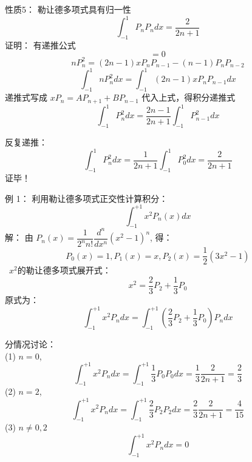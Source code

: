 \begin{frame}
	\alert{性质5：} 勒让德多项式具有归一性
	\begin{equation*}
		\int_{-1}^{1} P_nP_n dx = \frac{2}{2n+1}
	\end{equation*}	
	\alert{证明：}  有递推公式
	\begin{equation*}
		[nP_{n} -(2n-1)x P_{n-} + (n-1)P_{n-2} ] =0
	\end{equation*}		
	\begin{equation*}
		nP ^2 _{n} =(2n-1)x P_n P_{n-1} - (n-1)P_nP_{n-2} 
	\end{equation*}		
	\begin{equation*}
		\int_{-1}^{1}  nP ^2 _{n} dx =   \int_{-1}^{1}  (2n-1)x P_n P_{n-1} dx 
	\end{equation*}		
	递推式写成 $xP_n= A P_{n+1} +B P_{n-1}$ 代入上式，得积分递推式
	\begin{equation*}
		\int_{-1}^{1}  P ^2 _{n} dx =  \frac{2n-1}{2n+1}\int_{-1}^{1}   P^2_{n-1} dx 
	\end{equation*}		
\end{frame}	

\begin{frame}
	反复递推：
	\begin{equation*}
		\int_{-1}^{1}  P ^2 _{n} dx =  \frac{1}{2n+1}\int_{-1}^{1}   P^2_{0} dx = \frac{2}{2n+1}
	\end{equation*}		
	\alert{证毕！} 
\end{frame}	


\begin{frame}
	\alert{例 1：}	利用勒让德多项式正交性计算积分：
	\begin{equation*}
		\int_{-1}^{+1} x^2 P _{n}(x) dx 
	\end{equation*}		
	\alert{解：} 由 $ P_{n}(x)=\dfrac{1}{2^{n} n !} \dfrac{d^{n}}{d x^{n}}\left(x^{2}-1\right)^{n} $, 得：
	\begin{equation*}
		P_0(x)=1, 	P_1(x)=x,  P_2(x)= \dfrac{1}{2}(3x^2-1)  
	\end{equation*}	
	 $x^2$的勒让德多项式展开式：
	$$ x^2 =\dfrac{2}{3}P_2+\dfrac{1}{3}P_0$$
	原式为：
	\begin{equation*}
			\int_{-1}^{+1} x^2 P _{n} dx = \int_{-1}^{+1} (\dfrac{2}{3}P_2+\dfrac{1}{3}P_0)  P _{n} dx 	
	\end{equation*}	
\end{frame}	

\begin{frame}
	分情况讨论：\\
	(1)  $n=0$, 
	\begin{equation*}
		\int_{-1}^{+1} x^2 P _{n} dx  =   \int_{-1}^{+1} \dfrac{1}{3}P_0  P _{0} dx=\dfrac{1}{3} \frac{2}{2n+1}  = \dfrac{2}{3}	
	\end{equation*}	
	(2)  $n=2$, 
	\begin{equation*}
		\int_{-1}^{+1} x^2 P _{n} dx  =   \int_{-1}^{+1} \dfrac{2}{3}P_2  P _{2} dx= \dfrac{2}{3}\frac{2}{2n+1}  = \dfrac{4}{15}	
	\end{equation*}	
	(3) $ n\neq 0,2$
	\begin{equation*}
		\int_{-1}^{+1} x^2 P _{n} dx  =  0	
	\end{equation*}
\end{frame}	

